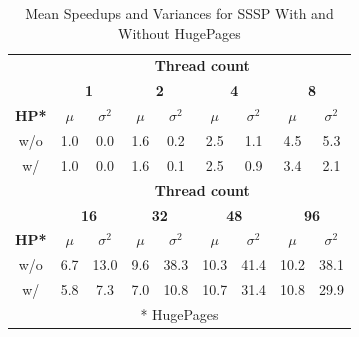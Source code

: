 \begin{table}
\renewcommand{\arraystretch}{1.2}
\centering
\caption{Mean Speedups and Variances for SSSP With and Without HugePages}
\label{tbl:ssspMeansVariances}
\begin{tabular}{ccccccccc}
\toprule
&\multicolumn{8}{c}{\bf Thread count}\\
\cmidrule(r){2-9}
&\multicolumn{2}{c}{\bf 1}&\multicolumn{2}{c}{\bf 2}&\multicolumn{2}{c}{\bf 4}&\multicolumn{2}{c}{\bf 8}\\
{\bf HP*}&$\mu$&$\sigma^2$&$\mu$&$\sigma^2$&$\mu$&$\sigma^2$&$\mu$&$\sigma^2$\\\hline
w/o&1.0&0.0&1.6&0.2&2.5&1.1&4.5&5.3\\
w/&1.0&0.0&1.6&0.1&2.5&0.9&3.4&2.1\\
\bottomrule
\toprule
&\multicolumn{8}{c}{\bf Thread count}\\
\cmidrule(r){2-9}
&\multicolumn{2}{c}{\bf 16}&\multicolumn{2}{c}{\bf 32}&\multicolumn{2}{c}{\bf 48}&\multicolumn{2}{c}{\bf 96}\\
{\bf HP*}&$\mu$&$\sigma^2$&$\mu$&$\sigma^2$&$\mu$&$\sigma^2$&$\mu$&$\sigma^2$\\\hline
w/o&6.7&13.0&9.6&38.3&10.3&41.4&10.2&38.1\\
w/&5.8&7.3&7.0&10.8&10.7&31.4&10.8&29.9\\\bottomrule
\multicolumn{9}{c}{* HugePages}
\end{tabular}
\end{table}


